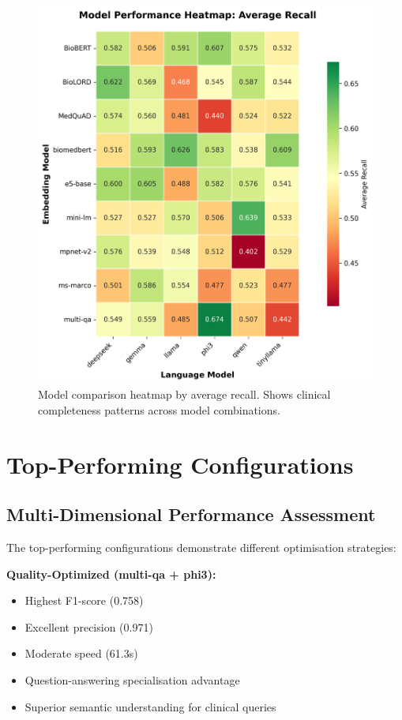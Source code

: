 \begin{figure}[!htbp]
  \centering
  \includegraphics[width=\textwidth]{chap4_results/images/heatmap_recall.png}
  \caption{Model comparison heatmap by average recall. Shows clinical completeness patterns across model combinations.}
  \label{fig:heatmap_recall}
\end{figure}

\section{Top-Performing Configurations}



\subsection{Multi-Dimensional Performance Assessment}

The top-performing configurations demonstrate different optimisation strategies:

\textbf{Quality-Optimized (multi-qa + phi3):}
\begin{itemize}
    \item Highest F1-score (0.758)
    \item Excellent precision (0.971)
    \item Moderate speed (61.3s)
    \item Question-answering specialisation advantage
    \item Superior semantic understanding for clinical queries
\end{itemize}

